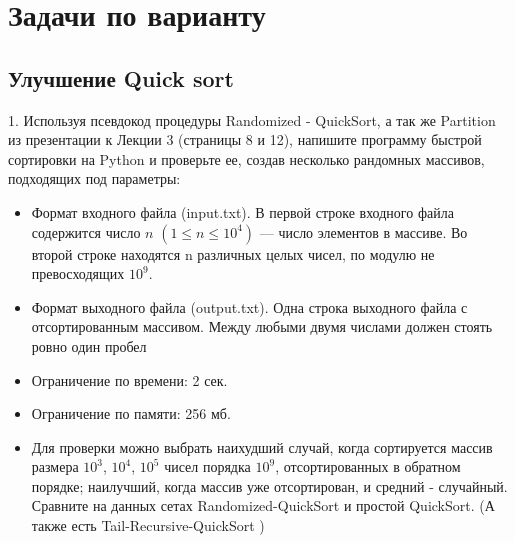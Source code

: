 \section{Задачи по варианту}

\subsection{Улучшение Quick sort}
1. Используя псевдокод процедуры Randomized - QuickSort, а так же Partition из презентации к Лекции 3 (страницы 8 и 12), напишите программу быстрой сортировки на Python и проверьте ее, создав несколько рандомных массивов, подходящих под параметры:
\begin{itemize}
	\item Формат входного файла (input.txt). В первой строке входного файла
    содержится число $n$ $(1 \le n \le 10^4)$ — число элементов в массиве.
    Во второй строке находятся n различных целых чисел, по модулю не
    превосходящих $10^9$.
	\item Формат выходного файла (output.txt). Одна строка выходного файла
    с отсортированным массивом. Между любыми двумя числами должен
    стоять ровно один пробел
	\item Ограничение по времени: 2 сек.
        \item Ограничение по памяти: 256 мб.
        \item Для проверки можно выбрать наихудший случай, когда сортируется
    массив размера $10^3$, $10^4$, $10^5$ чисел порядка $10^9$, отсортированных в обратном порядке; наилучший, когда массив уже отсортирован, и средний
    - случайный. Сравните на данных сетах Randomized-QuickSort и простой QuickSort. (А также есть Tail-Recursive-QuickSort \cite{bookalg})

\end{itemize}

